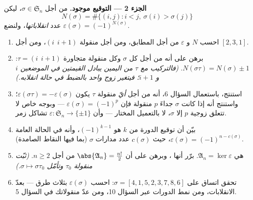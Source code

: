 \begin{problem}
\medskip
\noindent\textbf{الجزء 2 --- التوقيع موجود.} من أجل $\sigma
\in \mathfrak S_n$، ليكن
\[
N(\sigma) = \#\bigl\{(i, j) : i < j,\ \sigma(i) >
\sigma(j)\bigr\}
\]
عدد \emph{انقلاباتها}، ولنضع $\varepsilon(\sigma) =
(-1)^{N(\sigma)}$.
\begin{enumerate}[resume]
  \item احسب $N$ و $\varepsilon$ من أجل  المطابق، ومن أجل
        منقولة $(i\ \ i{+}1)$، ومن أجل $[2, 3, 1]$.
  \item برهن على أنه من أجل كل $\sigma$ وكل منقولة
        متجاورة $\tau = (i\ \ i{+}1)$:
        $N(\sigma\tau) = N(\sigma) \pm 1$. \emph{(فالتركيب مع
        $\tau$ من اليمين يبادل القيمتين في الموضعين $i$ و
        $i + 1$؛ فيتغير زوج واحد بالضبط في حالة
        انقلابه.)}
  \item استنتج، باستعمال السؤال 6، أنه من أجل \emph{أيّ}
        منقولة $\tau$ يكون $\varepsilon(\sigma\tau) =
        -\varepsilon(\sigma)$؛ واستنتج أنه إذا كانت $\sigma$
        جداءَ $p$ منقولة فإن $\varepsilon(\sigma)
        = (-1)^p$ --- وبوجه خاص لا تتعلق زوجية $p$
        إلا  $\sigma$، لا بالتعميل المختار --- وأن
        $\varepsilon \colon \mathfrak S_n \to \{\pm 1\}$ تشاكل زمر.
  \item بيّن أن توقيع الدورة من  $k$ هو $(-1)^{k-1}$، وأنه
        في الحالة العامة $\varepsilon(\sigma) = (-1)^{n -
        c(\sigma)}$، حيث $c(\sigma)$ عدد مدارات
        $\sigma$ (بما فيها النقاط الصامدة).
  \item \emph{} هي $\mathfrak A_n =
        \ker\varepsilon$. برّر أنها ، وبرهن على أن
        $\abs{\mathfrak A_n} = \frac{n!}2$ من أجل $n \geq 2$.
        \emph{(ثبّت منقولة $\tau_0$ وتأمّل $\sigma
        \mapsto \sigma\tau_0$.)}
  \item تحقق اتساق على $\sigma = [4, 1, 5, 2, 3, 7, 8, 6]$:
        احسب $\varepsilon(\sigma)$ بثلاث طرق --- بعدّ
        الانقلابات، ومن نمط الدورات عبر السؤال 10، ومن
        عدّ منقولاتك في السؤال 5.
\end{enumerate}


\end{problem}
